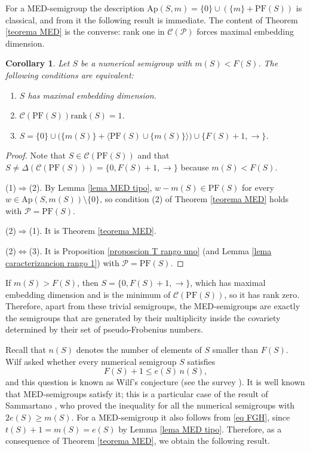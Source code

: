 \documentclass[11pt]{article}
\newtheorem{corollary}[theorem]{Corollary}
\numberwithin{equation}{section}
\newcommand{\CP}{\mathcal C(\mathcal P)}
\newcommand{\rk}{\mathrm{rank}}
\newcommand{\Ap}{\mathrm{Ap}}
\newcommand{\PF}{\mathrm{PF}}
\begin{document}
For a MED-semigroup the description $\Ap(S,m)=\{0\}\cup(\{m\}+\PF(S))$ is classical, and from it the following result is immediate. The content of Theorem \ref{teorema MED} is the converse: rank one in $\CP$ forces maximal embedding dimension.

\begin{corollary}\label{corolario MED}
Let $S$ be a numerical semigroup with $m(S)<F(S)$. The following conditions are equivalent:
\begin{enumerate}
\item $S$ has maximal embedding dimension.
\item $\mathcal C(\PF(S))\rk(S)=1$.
\item $S=\{0\}\cup\big(\{m(S)\}+\langle\PF(S)\cup\{m(S)\}\rangle\big)\cup\{F(S)+1,\rightarrow\}$.
\end{enumerate}
\end{corollary}

\begin{proof}
Note that $S\in\mathcal C(\PF(S))$ and that $S\neq\Delta(\mathcal C(\PF(S)))=\{0,F(S)+1,\rightarrow\}$ because $m(S)<F(S)$.

(1)$\Rightarrow$(2). By Lemma \ref{lema MED tipo}, $w-m(S)\in\PF(S)$ for every $w\in\Ap(S,m(S))\setminus\{0\}$, so condition (2) of Theorem \ref{teorema MED} holds with $\mathcal P=\PF(S)$.

(2)$\Rightarrow$(1). It is Theorem \ref{teorema MED}.

(2)$\Leftrightarrow$(3). It is Proposition \ref{proposcion T rango uno} (and Lemma \ref{lema caracterizancion rango 1}) with $\mathcal P=\PF(S)$.
\end{proof}

If $m(S)>F(S)$, then $S=\{0,F(S)+1,\rightarrow\}$, which has maximal embedding dimension and is the minimum of $\mathcal C(\PF(S))$, so it has rank zero. Therefore, apart from these trivial semigroups, the MED-semigroups are exactly the semigroups that are generated by their multiplicity inside the covariety determined by their set of pseudo-Frobenius numbers.

Recall that $n(S)$ denotes the number of elements of $S$ smaller than $F(S)$. Wilf \cite{wilf} asked whether every numerical semigroup $S$ satisfies
\[
F(S)+1\leq e(S)\,n(S),
\]
and this question is known as Wilf's conjecture (see the survey \cite{delgado-wilf}). It is well known that MED-semigroups satisfy it; this is a particular case of the result of Sammartano \cite{sammartano}, who proved the inequality for all the numerical semigroups with $2e(S)\geq m(S)$. For a MED-semigroup it also follows from \eqref{eq FGH}, since $t(S)+1=m(S)=e(S)$ by Lemma \ref{lema MED tipo}. Therefore, as a consequence of Theorem \ref{teorema MED}, we obtain the following result.
\end{document}

